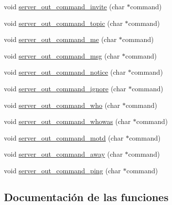 \begin{DoxyCompactItemize}
\item 
void \hyperlink{G-2313-06-P2__client__function__handlers_8h_a6760491bb5560bf6db1e652022f0720f}{server\+\_\+out\+\_\+command\+\_\+invite} (char $\ast$command)
\item 
void \hyperlink{G-2313-06-P2__client__function__handlers_8h_affd97f456e87778153ec551468bb7f25}{server\+\_\+out\+\_\+command\+\_\+topic} (char $\ast$command)
\item 
void \hyperlink{G-2313-06-P2__client__function__handlers_8h_a9680c711ecaa492727c14a9c5d7e82ca}{server\+\_\+out\+\_\+command\+\_\+me} (char $\ast$command)
\item 
void \hyperlink{G-2313-06-P2__client__function__handlers_8h_ad2280719361affeaf8d3a663b48f0b3f}{server\+\_\+out\+\_\+command\+\_\+msg} (char $\ast$command)
\item 
void \hyperlink{G-2313-06-P2__client__function__handlers_8h_a6e05dad9592e0e473e84647cfe263034}{server\+\_\+out\+\_\+command\+\_\+notice} (char $\ast$command)
\item 
void \hyperlink{G-2313-06-P2__client__function__handlers_8h_a3b0bef634e60a6e59223cfb7e444fb36}{server\+\_\+out\+\_\+command\+\_\+ignore} (char $\ast$command)
\item 
void \hyperlink{G-2313-06-P2__client__function__handlers_8h_a4f8f2db21b7edd9e6b7fbad232ee27fd}{server\+\_\+out\+\_\+command\+\_\+who} (char $\ast$command)
\item 
void \hyperlink{G-2313-06-P2__client__function__handlers_8h_a74f475c007446256a2cbada71f51f30a}{server\+\_\+out\+\_\+command\+\_\+whowas} (char $\ast$command)
\item 
void \hyperlink{G-2313-06-P2__client__function__handlers_8h_ae721ae6a65ec5f0790d6b6883dcf94a5}{server\+\_\+out\+\_\+command\+\_\+motd} (char $\ast$command)
\item 
void \hyperlink{G-2313-06-P2__client__function__handlers_8h_ac0c8a1e0d4144fd3d78c124bad9228d6}{server\+\_\+out\+\_\+command\+\_\+away} (char $\ast$command)
\item 
void \hyperlink{G-2313-06-P2__client__function__handlers_8h_a3719651e6671245a46f4994fcf462c7d}{server\+\_\+out\+\_\+command\+\_\+ping} (char $\ast$command)
\end{DoxyCompactItemize}


\subsection{Documentación de las funciones}
